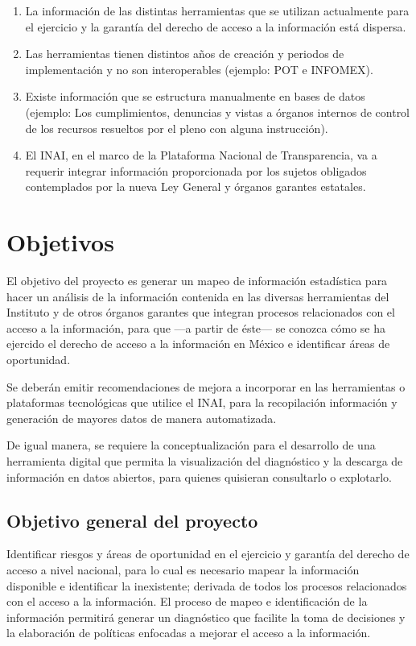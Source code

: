\begin{enumerate}
\item La información de las distintas herramientas que se utilizan actualmente para el ejercicio y la garantía del derecho de acceso a la información está dispersa.
\item Las herramientas tienen distintos años de creación y periodos de implementación y no son interoperables (ejemplo: POT e INFOMEX).
\item Existe información que se estructura manualmente en bases de datos (ejemplo: Los cumplimientos, denuncias y vistas a órganos internos de control de los recursos resueltos por el pleno con alguna instrucción).
\item El INAI, en el marco de la Plataforma Nacional de Transparencia, va a requerir integrar información proporcionada por los sujetos obligados contemplados por la nueva Ley General y órganos garantes estatales.
\end{enumerate}

\section{Objetivos}
\label{sec:objetivos}

El objetivo del proyecto es generar un mapeo de información estadística para hacer un análisis de la información contenida en las diversas herramientas del Instituto y de otros órganos garantes que integran procesos relacionados con el acceso a la información, para que ---a partir de éste--- se conozca cómo se ha ejercido el derecho de acceso a la información en México e identificar áreas de oportunidad. 

Se deberán emitir recomendaciones de mejora a incorporar en las herramientas o plataformas tecnológicas que utilice el INAI, para la recopilación información y generación de mayores datos de manera automatizada. 

De igual manera, se requiere la conceptualización para el desarrollo de una herramienta digital que permita la visualización del diagnóstico y la descarga de información en datos abiertos, para quienes quisieran consultarlo o explotarlo.


\subsection{Objetivo general del proyecto}

Identificar riesgos y áreas de oportunidad en el ejercicio y garantía del derecho de acceso a nivel nacional, para lo cual es necesario mapear la información disponible e identificar la inexistente; derivada de todos los procesos relacionados con el acceso a la información. El proceso de mapeo e identificación de la información permitirá generar un diagnóstico que facilite la toma de decisiones y la elaboración de políticas enfocadas a mejorar el acceso a la información. 


